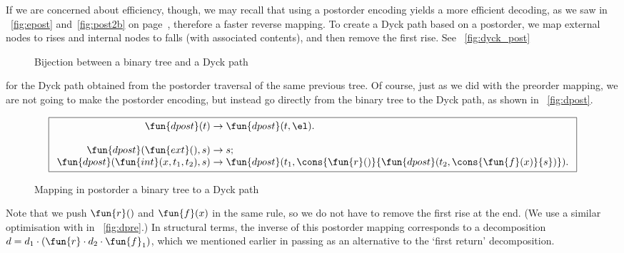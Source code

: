If we are concerned about efficiency, though, we may recall that using
a postorder encoding yields a
more efficient decoding, as we saw in
\figs~\ref{fig:epost}
and~\ref{fig:post2b} on
page~\pageref{fig:epost}, therefore a faster reverse mapping. To
create a Dyck path based on a postorder, we map
external nodes to rises and internal nodes to falls (with associated
contents), and then remove the first rise. See
\fig~\vref{fig:dyck_post}
\begin{figure}
\centering
{}
\qquad\quad
\subfloat[Dyck path corresponding to postorder encoding $[\Box,\Box,\Box,2,1,\Box,\Box,3,0\char93$\label{fig:dyck_post}]{%
\texttt{[image: dyck\_post]}}
\caption{Bijection between a binary tree and a Dyck path}
\end{figure}
for the Dyck path obtained from the postorder traversal of the same
previous tree. Of course, just as we did with the preorder mapping, we
are not going to make the postorder encoding, but instead go directly from the binary
tree to the Dyck path, as shown in
\fig~\vref{fig:dpost}.
\begin{figure}[t]
\begin{equation*}
\boxed{
\begin{array}{r@{\;}c@{\;}l}
\fun{dpost}(t) & \rightarrow & \fun{dpost}(t,\el).\\
\\
\fun{dpost}(\fun{ext}(),s) & \rightarrow & s;\\
\fun{dpost}(\fun{int}(x,t_1,t_2),s)
  & \rightarrow
  & \fun{dpost}(t_1,\cons{\fun{r}()}{\fun{dpost}(t_2,\cons{\fun{f}(x)}{s})}).
\end{array}}
\end{equation*}
\caption{Mapping in postorder a binary tree to a Dyck path}
\label{fig:dpost}
\end{figure}
Note that we push \(\fun{r}()\) and \(\fun{f}(x)\) in the same rule,
so we do not have to remove the first rise at the end. (We use a
similar optimisation with  in
\fig~\vref{fig:dpre}.) In structural terms, the inverse of this
postorder mapping corresponds to a decomposition \(d = d_1 \cdot
(\fun{r} \cdot d_2 \cdot \fun{f}_1)\), which we mentioned earlier in
passing as an alternative to the `first return'
decomposition.

